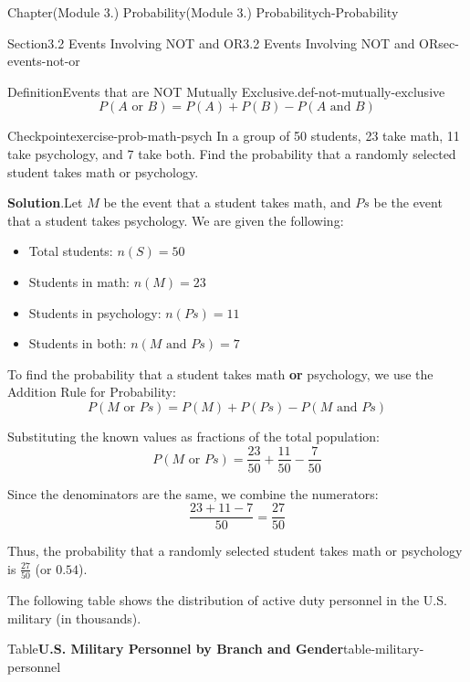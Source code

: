 \documentclass[oneside,10pt,]{book}
\newcommand{\blocktitlefont}{\relax}
\newcommand{\ptxlistdisc}{\raisebox{0.3ex}{\textbullet}}
\newcommand{\terminology}[1]{\textbf{#1}}
\begin{document}
\begin{chapterptx}{Chapter}{(Module 3.) Probability}{}{(Module 3.) Probability}{}{}{ch-Probability}
\begin{sectionptx}{Section}{3.2 Events Involving NOT and OR}{}{3.2 Events Involving NOT and OR}{}{}{sec-events-not-or}
\begin{definition}{Definition}{Events that are NOT Mutually Exclusive.}{def-not-mutually-exclusive}
\begin{equation*}
P(A \text{ or } B) = P(A) + P(B) - P(A \text{ and } B)
\end{equation*}
%
\end{definition}
\begin{inlineexercise}{Checkpoint}{}{exercise-prob-math-psych}%
In a group of 50 students, 23 take math, 11 take psychology, and 7 take both. Find the probability that a randomly selected student takes math or psychology.%
\par\smallskip%
\noindent\textbf{\blocktitlefont Solution}.\hypertarget{exercise-prob-math-psych-2}{}\quad{}Let \(M\) be the event that a student takes math, and \(Ps\) be the event that a student takes psychology. We are given the following:%
\begin{itemize}[label=\ptxlistdisc]
\item{}Total students: \(n(S) = 50\)%
\item{}Students in math: \(n(M) = 23\)%
\item{}Students in psychology: \(n(Ps) = 11\)%
\item{}Students in both: \(n(M \text{ and } Ps) = 7\)%
\end{itemize}
%
\par
To find the probability that a student takes math \terminology{or} psychology, we use the Addition Rule for Probability:%
\begin{equation*}
P(M \text{ or } Ps) = P(M) + P(Ps) - P(M \text{ and } Ps)
\end{equation*}
%
\par
Substituting the known values as fractions of the total population:%
\begin{equation*}
P(M \text{ or } Ps) = \frac{23}{50} + \frac{11}{50} - \frac{7}{50}
\end{equation*}
%
\par
Since the denominators are the same, we combine the numerators:%
\begin{equation*}
\frac{23 + 11 - 7}{50} = \frac{27}{50}
\end{equation*}
%
\par
Thus, the probability that a randomly selected student takes math or psychology is \(\frac{27}{50}\) (or \(0.54\)).%
\end{inlineexercise}%
The following table shows the distribution of active duty personnel in the U.S. military (in thousands).%
\begin{tableptx}{Table}{\textbf{U.S. Military Personnel by Branch and Gender}}{table-military-personnel}{}%

\end{tableptx}
\end{sectionptx}
\end{chapterptx}
\end{document}

